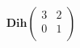 \documentclass[preview]{standalone}
\begin{document}
\begin{align*}
\mathbf{Dih}\begin{pmatrix}3 & 2\\ 0 & 1\\\end{pmatrix}
\end{align*}
\end{document}
